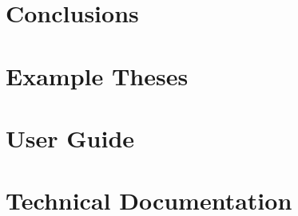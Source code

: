   \chapter{Conclusions} 
    \blindtext

  \newpage
  {\singlespacing
  \nocite{*}
  \printbibliography}

  \newpage
  \printglossaries

  \printindex

  \begin{appendices}

    \chapter{Example Theses} 
      \blindtext

    \chapter{User Guide} 
      \blindtext

    \chapter{Technical Documentation} 
      \blindtext

  \end{appendices}


